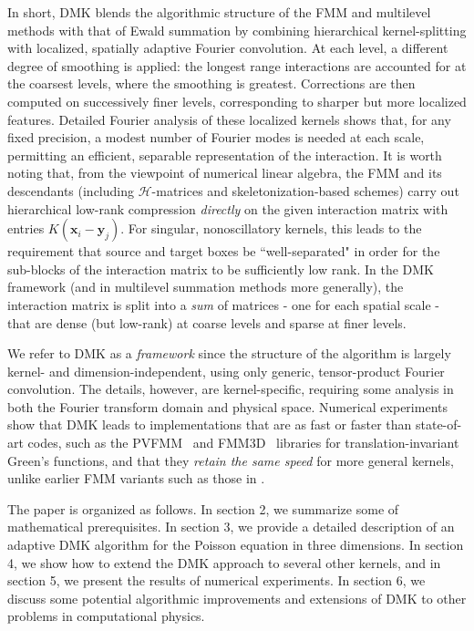 \documentclass[final,letterpaper]{siamart171218}
\newcommand{\x}{\boldsymbol{x}}
\newcommand{\y}{\boldsymbol{y}}
\newcommand{\acron}{DMK }
\begin{document}
In short, \acron blends the algorithmic structure of the FMM and
multilevel methods with that of Ewald summation by combining
hierarchical kernel-splitting with localized, spatially adaptive Fourier
convolution.
At each level, a different degree of smoothing is applied:
the longest range interactions are accounted for 
at the coarsest levels, where the smoothing is greatest. Corrections are then
computed on successively finer levels, corresponding to sharper
but more localized features. Detailed Fourier analysis of these
localized kernels shows that, for any fixed precision, 
a modest number of Fourier modes is needed at each scale, permitting an efficient,
separable representation of the interaction.
It is worth noting that,
from the viewpoint of numerical linear algebra, the FMM and its descendants
(including ${\mathcal H}$-matrices and skeletonization-based schemes) 
\cite{fmm3,hackbusch1999,hackbusch2002,ho2012fast,minden:2017a:multiscale-model-simul}
carry out hierarchical low-rank compression {\em directly} on the given 
interaction matrix with entries $K(\x_i-\y_j)$.
For singular, nonoscillatory kernels, this leads to the requirement that source and
target boxes be ``well-separated" in order for the sub-blocks of the 
interaction matrix to be sufficiently low rank. 
In the \acron framework (and in multilevel summation methods more generally), 
the interaction matrix
is split into a {\em sum} of matrices - one for each spatial scale - 
that are dense (but low-rank)
at coarse levels and sparse at finer levels. 

We refer to \acron as a {\em framework} since the structure of the algorithm
is largely kernel- and dimension-independent,
using only generic, tensor-product Fourier convolution. The details, however, are
kernel-specific, requiring some analysis in both the Fourier transform domain
and physical space.  Numerical experiments show that \acron leads to 
implementations that are as fast or faster than state-of-art codes, such
as the PVFMM~\cite{pvfmm} and FMM3D~\cite{fmm3d} libraries for 
translation-invariant Green's functions,
and that they {\em retain the same speed} for more general kernels, unlike earlier
FMM variants such as those in \cite{fmm3,fmm4}.

The paper is organized as follows. 
In section 2, we summarize some of mathematical prerequisites.
In section 3, we provide a detailed description of an adaptive \acron
algorithm for the Poisson equation in three dimensions.
In section 4, we show how to extend the \acron approach to several other kernels,
and in section 5, we present the results of numerical experiments.
In section 6, we discuss some potential algorithmic improvements 
and extensions of \acron to other problems in computational physics. 
%
\end{document}
